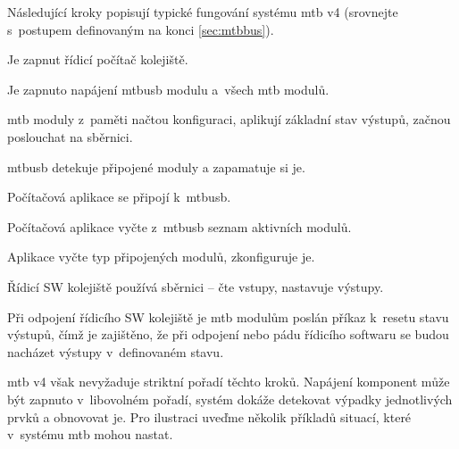 Následující kroky popisují typické fungování systému \gls{mtb} v4 (srovnejte
s~postupem definovaným na konci \ref{sec:mtbbus}).

\begin{compactenum}
\item Je zapnut řídicí počítač kolejiště.
\item Je zapnuto napájení \gls{mtbusb} modulu a~všech \gls{mtb} modulů.
\item \gls{mtb} moduly z~paměti načtou konfiguraci, aplikují základní stav
výstupů, začnou poslouchat na sběrnici.
\item \gls{mtbusb} detekuje připojené moduly a zapamatuje si je.
\item Počítačová aplikace se připojí k~\gls{mtbusb}.
\item Počítačová aplikace vyčte z~\gls{mtbusb} seznam aktivních modulů.
\item Aplikace vyčte typ připojených modulů, zkonfiguruje je.
\item Řídicí SW kolejiště používá sběrnici – čte vstupy, nastavuje výstupy.
\item Při odpojení řídicího SW kolejiště je \gls{mtb} modulům poslán příkaz
	k~resetu stavu výstupů, čímž je zajištěno, že při odpojení nebo pádu
	řídicího softwaru se budou nacházet výstupy v~definovaném stavu.
\end{compactenum}

\gls{mtb} v4 však nevyžaduje striktní pořadí těchto kroků. Napájení
komponent může být zapnuto v~libovolném pořadí, systém dokáže detekovat výpadky
jednotlivých prvků a obnovovat je. Pro ilustraci uveďme několik příkladů situací,
které v~systému \gls{mtb} mohou nastat.

